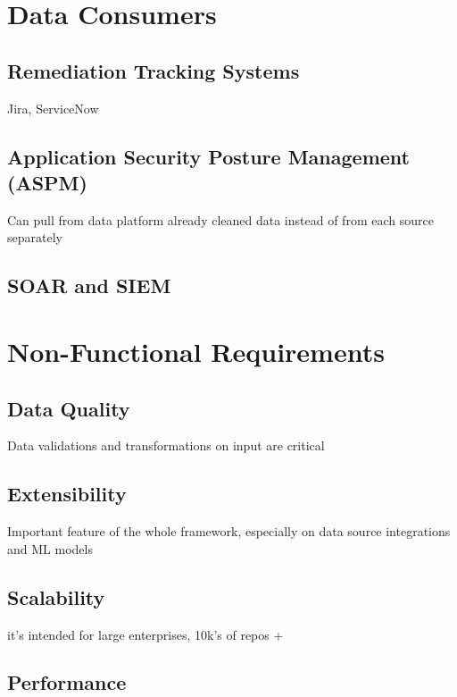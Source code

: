 
\section{Data Consumers}

\subsection{Remediation Tracking Systems}

Jira, ServiceNow

\subsection{Application Security Posture Management (ASPM)}

Can pull from data platform already cleaned data instead of from each source separately

\subsection{SOAR and SIEM}



\section{Non-Functional Requirements}

\subsection{Data Quality}

Data validations and transformations on input are critical

\subsection{Extensibility}

Important feature of the whole framework, especially on data source integrations and ML models

\subsection{Scalability}

it's intended for large enterprises, 10k's of repos +

\subsection{Performance}

